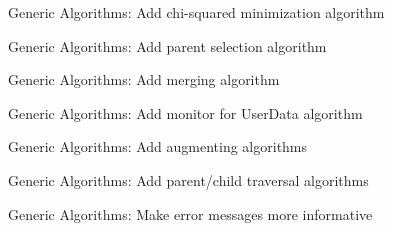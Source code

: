 
\begin{DoxyRefList}
\item[\label{todo__todo000001}%
\hypertarget{todo__todo000001}{}%
Namespace \hyperlink{namespace_h_a_l}{H\+A\+L} ]Generic Algorithms\+: Add chi-\/squared minimization algorithm 

Generic Algorithms\+: Add parent selection algorithm 

Generic Algorithms\+: Add merging algorithm 

Generic Algorithms\+: Add monitor for User\+Data algorithm 

Generic Algorithms\+: Add augmenting algorithms 

Generic Algorithms\+: Add parent/child traversal algorithms 

Generic Algorithms\+: Make error messages more informative 
\end{DoxyRefList}